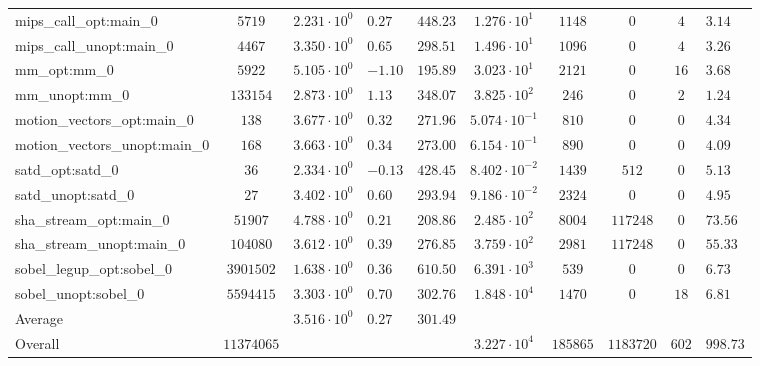 \begin{tabular}{|l|c|HHc|c|c|c|cH|}
mips\_call\_opt:main\_0                         & $ 5719     $ & $ 2.231 \cdot 10^{0} $ & $ 0.27  $ & $ 448.23 $ & $ 1.276 \cdot 10^{1}  $ & $ 1148   $ & $ 0       $ & $ 4   $ & $ 3.14    $ \\
mips\_call\_unopt:main\_0                       & $ 4467     $ & $ 3.350 \cdot 10^{0} $ & $ 0.65  $ & $ 298.51 $ & $ 1.496 \cdot 10^{1}  $ & $ 1096   $ & $ 0       $ & $ 4   $ & $ 3.26    $ \\
mm\_opt:mm\_0                                   & $ 5922     $ & $ 5.105 \cdot 10^{0} $ & $ -1.10 $ & $ 195.89 $ & $ 3.023 \cdot 10^{1}  $ & $ 2121   $ & $ 0       $ & $ 16  $ & $ 3.68    $ \\
mm\_unopt:mm\_0                                 & $ 133154   $ & $ 2.873 \cdot 10^{0} $ & $ 1.13  $ & $ 348.07 $ & $ 3.825 \cdot 10^{2}  $ & $ 246    $ & $ 0       $ & $ 2   $ & $ 1.24    $ \\
motion\_vectors\_opt:main\_0                    & $ 138      $ & $ 3.677 \cdot 10^{0} $ & $ 0.32  $ & $ 271.96 $ & $ 5.074 \cdot 10^{-1} $ & $ 810    $ & $ 0       $ & $ 0   $ & $ 4.34    $ \\
motion\_vectors\_unopt:main\_0                  & $ 168      $ & $ 3.663 \cdot 10^{0} $ & $ 0.34  $ & $ 273.00 $ & $ 6.154 \cdot 10^{-1} $ & $ 890    $ & $ 0       $ & $ 0   $ & $ 4.09    $ \\
satd\_opt:satd\_0                               & $ 36       $ & $ 2.334 \cdot 10^{0} $ & $ -0.13 $ & $ 428.45 $ & $ 8.402 \cdot 10^{-2} $ & $ 1439   $ & $ 512     $ & $ 0   $ & $ 5.13    $ \\
satd\_unopt:satd\_0                             & $ 27       $ & $ 3.402 \cdot 10^{0} $ & $ 0.60  $ & $ 293.94 $ & $ 9.186 \cdot 10^{-2} $ & $ 2324   $ & $ 0       $ & $ 0   $ & $ 4.95    $ \\
sha\_stream\_opt:main\_0                        & $ 51907    $ & $ 4.788 \cdot 10^{0} $ & $ 0.21  $ & $ 208.86 $ & $ 2.485 \cdot 10^{2}  $ & $ 8004   $ & $ 117248  $ & $ 0   $ & $ 73.56   $ \\
sha\_stream\_unopt:main\_0                      & $ 104080   $ & $ 3.612 \cdot 10^{0} $ & $ 0.39  $ & $ 276.85 $ & $ 3.759 \cdot 10^{2}  $ & $ 2981   $ & $ 117248  $ & $ 0   $ & $ 55.33   $ \\
sobel\_legup\_opt:sobel\_0                      & $ 3901502  $ & $ 1.638 \cdot 10^{0} $ & $ 0.36  $ & $ 610.50 $ & $ 6.391 \cdot 10^{3}  $ & $ 539    $ & $ 0       $ & $ 0   $ & $ 6.73    $ \\
sobel\_unopt:sobel\_0                           & $ 5594415  $ & $ 3.303 \cdot 10^{0} $ & $ 0.70  $ & $ 302.76 $ & $ 1.848 \cdot 10^{4}  $ & $ 1470   $ & $ 0       $ & $ 18  $ & $ 6.81    $ \\
\hline
Average                                         & $          $ & $ 3.516 \cdot 10^{0} $ & $ 0.27  $ & $ 301.49 $ & $                     $ & $        $ & $         $ & $     $ & $         $ \\
\hline
Overall                                         & $ 11374065 $ & $                    $ & $       $ & $        $ & $ 3.227 \cdot 10^{4}  $ & $ 185865 $ & $ 1183720 $ & $ 602 $ & $ 998.73  $ \\
\hline
\end{tabular}
